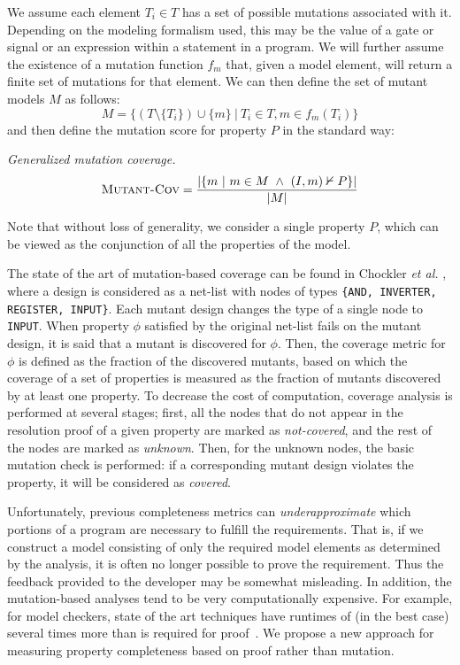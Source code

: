 We assume each element $T_i \in T$ has a set of possible mutations associated with it.  Depending on the modeling formalism used, this may be the value of a gate or signal or an expression within a statement in a program.  We will further assume the existence of a mutation function $f_{m}$ that, given a model element, will return a finite set of mutations for that element.  We can then define the set of mutant models $M$ as follows:
\[
    M = \{ (T \setminus \{T_i\}) \cup \{m\} \ |\ T_i \in T, m \in f_{m}(T_i) \}
\]
\noindent and then define the mutation score for property $P$ in the standard way:
\begin{definition} {\emph{Generalized mutation coverage.} } \\
\[
   \text{\sc Mutant-Cov} = \frac{ | \{m~|~ m \in M~\land~(I, m) \nvdash P\} |}{|M|}
\]
\end{definition}

\noindent Note that without loss of generality, we consider a single property $P$, which can be viewed as the conjunction of all the properties of the model.

The state of the art of mutation-based coverage can be found in Chockler \textit{et al.} \cite{chockler2010coverage}, where a design is considered as a net-list with nodes of types {\small \texttt{\{AND, INVERTER, REGISTER, INPUT\}}}.
Each mutant design changes the type of a single node to {\small \texttt{INPUT}}. When property $\phi$ satisfied by the original net-list fails on the mutant design, it is said that a mutant is discovered for $\phi$. Then, the coverage metric for $\phi$ is defined as the fraction of the discovered mutants, based on which the coverage of a set of properties is measured as the fraction of mutants discovered by at least one property.
To decrease the cost of computation, coverage analysis is performed at several stages; first, all the nodes that do not appear in the resolution proof of a given property are marked as \emph{not-covered}, and the rest of the nodes are marked as \emph{unknown}. Then, for the unknown nodes, the basic mutation check is performed: if a corresponding mutant design violates the property, it will be considered as \emph{covered}.

Unfortunately, previous completeness metrics can {\em underapproximate} which portions of a program are necessary to fulfill the requirements.  That is, if we construct a model consisting of only the required model elements as determined by the analysis, it is often no longer possible to prove the requirement.  Thus the feedback provided to the developer may be somewhat misleading.  In addition, the mutation-based analyses tend to be very computationally expensive.  For example, for model checkers, state of the art techniques have runtimes of (in the best case) several times more than is required for proof~\cite{chockler2010coverage}. We propose a new approach for measuring property completeness based on proof rather than mutation.


